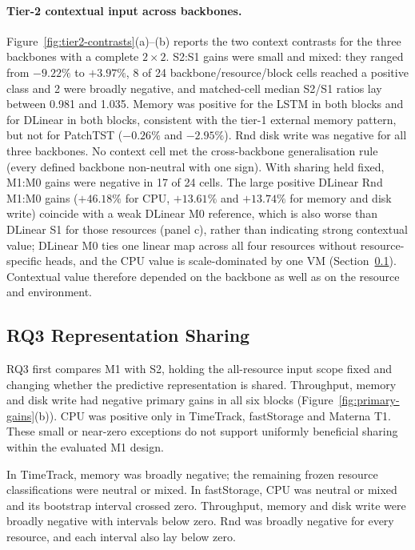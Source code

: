 \documentclass[a4paper,fleqn]{cas-dc}
\begin{document}
\paragraph{Tier-2 contextual input across backbones.}
Figure~\ref{fig:tier2-contrasts}(a)--(b) reports the two context contrasts
for the three backbones with a complete $2\times2$. S2:S1 gains were small
and mixed: they ranged from $-9.22\%$ to $+3.97\%$, 8 of 24
backbone/resource/block cells reached a positive class and 2 were broadly
negative, and matched-cell median S2/S1 ratios lay between 0.981 and 1.035.
Memory was positive for the LSTM in both blocks and for DLinear in both
blocks, consistent with the tier-1 external memory pattern, but not for
PatchTST ($-0.26\%$ and $-2.95\%$). Rnd disk write was negative for all
three backbones. No context cell met the cross-backbone generalisation rule
(every defined backbone non-neutral with one sign). With sharing held fixed,
M1:M0 gains were negative in 17 of 24 cells. The large positive DLinear Rnd
M1:M0 gains ($+46.18\%$ for CPU, $+13.61\%$ and $+13.74\%$ for memory and disk
write) coincide with a weak DLinear M0 reference, which is also worse than
DLinear S1 for those resources (panel c), rather than indicating strong
contextual value; DLinear M0 ties one linear map across all four resources without
resource-specific heads, and the CPU value is scale-dominated by one VM
(Section~\ref{sec:results-rq2}). Contextual value therefore depended on the
backbone as well as on the resource and environment.

\subsection{RQ3 Representation Sharing}
\label{sec:results-rq2}

RQ3 first compares M1 with S2, holding the all-resource input scope fixed and changing
whether the predictive representation is shared. Throughput, memory and disk
write had negative primary gains in all six blocks
(Figure~\ref{fig:primary-gains}(b)). CPU was positive only in TimeTrack,
fastStorage and Materna T1. These small or near-zero exceptions do not support
uniformly beneficial sharing within the evaluated M1 design.

In TimeTrack, memory was broadly negative; the remaining frozen resource
classifications were neutral or mixed. In fastStorage, CPU was neutral or
mixed and its bootstrap interval crossed zero. Throughput, memory and disk
write were broadly negative with intervals below zero. Rnd was broadly
negative for every resource, and each interval also lay below zero.
\end{document}
